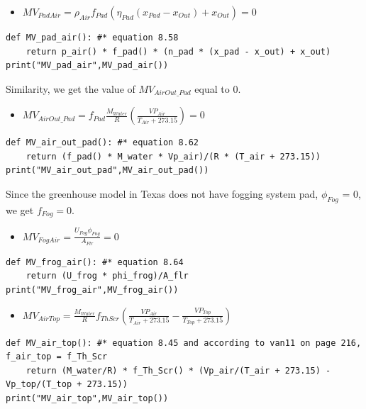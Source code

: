 \documentclass[a4paper]{article}
\numberwithin{equation}{section}
\begin{document}
\begin{itemize}
    \item $ MV_{PadAir} = \rho_{Air} f_{Pad} (\eta_{Pad} (x_{Pad} - x_{Out}) + x_{Out}) = 0$
\end{itemize}
\begin{mdframed}[leftline=false,rightline=false,backgroundcolor=cyan!10]
  \begin{verbatim}
def MV_pad_air(): #* equation 8.58
    return p_air() * f_pad() * (n_pad * (x_pad - x_out) + x_out)
print("MV_pad_air",MV_pad_air())
\end{verbatim}
\end{mdframed}

Similarity, we get the value of $MV_{AirOut\_Pad}$ equal to 0.
\begin{itemize}
    \item $ MV_{AirOut\_Pad} = f_{Pad} \frac{M_{Water}}{R} \left(\frac{VP_{Air}}{T_{Air} + 273.15}\right) = 0$
\end{itemize}
\begin{mdframed}[leftline=false,rightline=false,backgroundcolor=cyan!10]
  \begin{verbatim}
def MV_air_out_pad(): #* equation 8.62
    return (f_pad() * M_water * Vp_air)/(R * (T_air + 273.15))
print("MV_air_out_pad",MV_air_out_pad())
\end{verbatim}
\end{mdframed}

Since the greenhouse model in Texas does not have fogging system pad, $\phi_{Fog}$ =  0, we get $f_{Fog} = 0$. 
\begin{itemize}
    \item $MV_{FogAir} = \frac{U_{Fog} \phi_{Fog}}{A_{Flr}} = 0$
\end{itemize}
\begin{mdframed}[leftline=false,rightline=false,backgroundcolor=cyan!10]
  \begin{verbatim}
def MV_frog_air(): #* equation 8.64
    return (U_frog * phi_frog)/A_flr
print("MV_frog_air",MV_frog_air())
\end{verbatim}
\end{mdframed}

\begin{itemize}
    \item $MV_{AirTop} = \frac{M_{Water}}{R} f_{ThScr} \left(\frac{VP_{Air}}{T_{Air} + 273.15} - \frac{VP_{Top}}{T_{Top} + 273.15}\right)    $
\end{itemize}
\begin{mdframed}[leftline=false,rightline=false,backgroundcolor=cyan!10]
  \begin{verbatim}
def MV_air_top(): #* equation 8.45 and according to van11 on page 216, f_air_top = f_Th_Scr 
    return (M_water/R) * f_Th_Scr() * (Vp_air/(T_air + 273.15) - Vp_top/(T_top + 273.15))
print("MV_air_top",MV_air_top())
\end{verbatim}
\end{mdframed}
\end{document}
